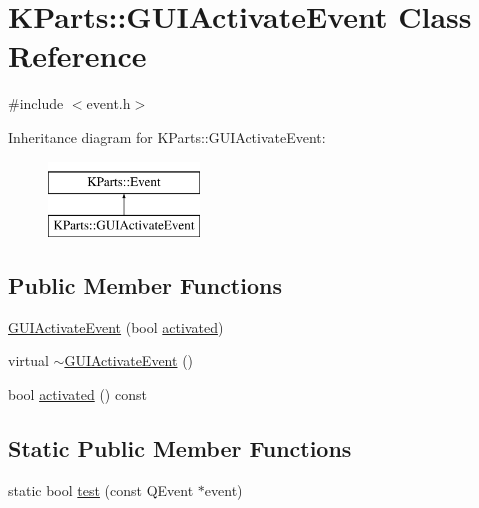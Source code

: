 \hypertarget{classKParts_1_1GUIActivateEvent}{\section{\-K\-Parts\-:\-:\-G\-U\-I\-Activate\-Event \-Class \-Reference}
\label{classKParts_1_1GUIActivateEvent}
}


{\ttfamily \#include $<$event.\-h$>$}

\-Inheritance diagram for \-K\-Parts\-:\-:\-G\-U\-I\-Activate\-Event\-:\begin{figure}[H]
\begin{center}
\leavevmode
\includegraphics[height=2.000000cm]{classKParts_1_1GUIActivateEvent}
\end{center}
\end{figure}
\subsection*{\-Public \-Member \-Functions}
\begin{DoxyCompactItemize}
\item 
\hyperlink{classKParts_1_1GUIActivateEvent_a303f43218976a3af5612b127b7cdb06d}{\-G\-U\-I\-Activate\-Event} (bool \hyperlink{classKParts_1_1GUIActivateEvent_a6656d719771003b7877dc1137da82beb}{activated})
\item 
virtual \hyperlink{classKParts_1_1GUIActivateEvent_a26879d8d165ab17efcb773f0dce94d18}{$\sim$\-G\-U\-I\-Activate\-Event} ()
\item 
bool \hyperlink{classKParts_1_1GUIActivateEvent_a6656d719771003b7877dc1137da82beb}{activated} () const 
\end{DoxyCompactItemize}
\subsection*{\-Static \-Public \-Member \-Functions}
\begin{DoxyCompactItemize}
\item 
static bool \hyperlink{classKParts_1_1GUIActivateEvent_a360a35ee2b385c6b615e909e4a885e83}{test} (const \-Q\-Event $\ast$event)
\end{DoxyCompactItemize}


